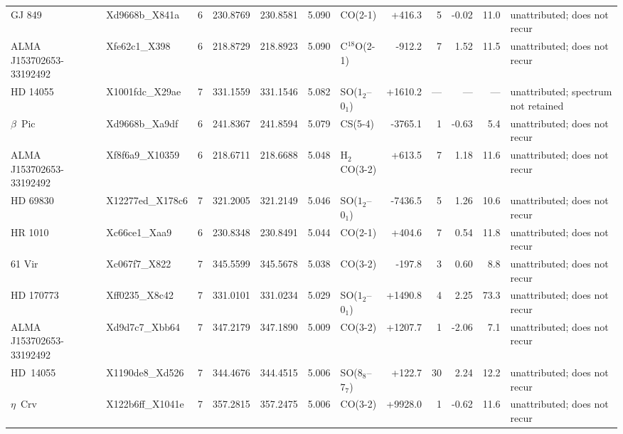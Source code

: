 \begin{tabular}{@{}l@{~}l@{~}c@{~}r@{~}r@{~}r@{~}l@{~}r@{~~}r@{~}r@{~}r@{~}l@{}}
GJ 849 & Xd9668b\_X841a & 6 & 230.8769 & 230.8581 & 5.090 & CO(2-1) & +416.3 & 5 & -0.02 & 11.0 & unattributed; does not recur \\
ALMA J153702653-33192492 & Xfe62c1\_X398 & 6 & 218.8729 & 218.8923 & 5.090 & C$^{18}$O(2-1) & -912.2 & 7 & 1.52 & 11.5 & unattributed; does not recur \\
HD 14055 & X1001fdc\_X29ae & 7 & 331.1559 & 331.1546 & 5.082 & SO($1_2$--$0_1$) & +1610.2 & --- & --- & --- & unattributed; spectrum not retained \\
$\beta$~Pic & Xd9668b\_Xa9df & 6 & 241.8367 & 241.8594 & 5.079 & CS(5-4) & -3765.1 & 1 & -0.63 & 5.4 & unattributed; does not recur \\
ALMA J153702653-33192492 & Xf8f6a9\_X10359 & 6 & 218.6711 & 218.6688 & 5.048 & H$_2$CO(3-2) & +613.5 & 7 & 1.18 & 11.6 & unattributed; does not recur \\
HD 69830 & X12277ed\_X178c6 & 7 & 321.2005 & 321.2149 & 5.046 & SO($1_2$--$0_1$) & -7436.5 & 5 & 1.26 & 10.6 & unattributed; does not recur \\
HR 1010 & Xc66ce1\_Xaa9 & 6 & 230.8348 & 230.8491 & 5.044 & CO(2-1) & +404.6 & 7 & 0.54 & 11.8 & unattributed; does not recur \\
61 Vir & Xc067f7\_X822 & 7 & 345.5599 & 345.5678 & 5.038 & CO(3-2) & -197.8 & 3 & 0.60 & 8.8 & unattributed; does not recur \\
HD 170773 & Xff0235\_X8c42 & 7 & 331.0101 & 331.0234 & 5.029 & SO($1_2$--$0_1$) & +1490.8 & 4 & 2.25 & 73.3 & unattributed; does not recur \\
ALMA J153702653-33192492 & Xd9d7c7\_Xbb64 & 7 & 347.2179 & 347.1890 & 5.009 & CO(3-2) & +1207.7 & 1 & -2.06 & 7.1 & unattributed; does not recur \\
HD~14055 & X1190de8\_Xd526 & 7 & 344.4676 & 344.4515 & 5.006 & SO($8_8$--$7_7$) & +122.7 & 30 & 2.24 & 12.2 & unattributed; does not recur \\
$\eta$~Crv & X122b6ff\_X1041e & 7 & 357.2815 & 357.2475 & 5.006 & CO(3-2) & +9928.0 & 1 & -0.62 & 11.6 & unattributed; does not recur \\
\hline
\end{tabular}
